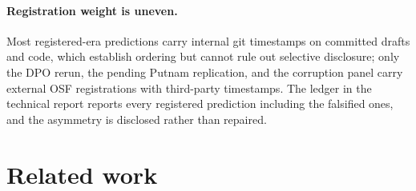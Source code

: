 \documentclass[11pt]{article}
\begin{document}
\paragraph{Registration weight is uneven.}
Most registered-era predictions carry internal git timestamps on committed drafts and code, which establish ordering but cannot rule out selective disclosure; only the DPO rerun, the pending Putnam replication, and the corruption panel carry external OSF registrations with third-party timestamps.
The ledger in the technical report reports every registered prediction including the falsified ones, and the asymmetry is disclosed rather than repaired.

\section{Related work}
\label{sec:related}
\end{document}
